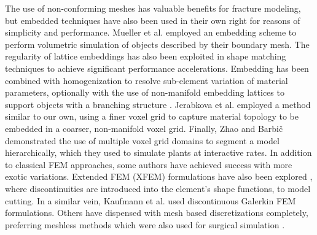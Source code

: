 \documentclass[12pt,oneside,letterpaper]{memoir}
\begin{document}
The use of non-conforming meshes has valuable benefits for fracture
modeling, but embedded techniques have also been used in their own
right for reasons of simplicity and performance. Mueller et al.\!
 employed an embedding scheme to perform
volumetric simulation of objects described by their boundary mesh. The
regularity of lattice embeddings has also been exploited in shape
matching techniques \cite{RiverJ:2007} to achieve significant
performance accelerations. Embedding has been combined with
homogenization \cite{NesmePF:2006,KhareMOD:2009} to resolve
sub-element variation of material parameters, optionally with the use
of non-manifold embedding lattices to support objects with a branching
structure \cite{NesmeKJF:2009}.  Jerabkova et al.\!
 employed a method similar to our own, using
a finer voxel grid to capture material topology to be embedded in a
coarser, non-manifold voxel grid. Finally, Zhao and Barbi\v{c}
 demonstrated the use of multiple voxel grid
domains to segment a model hierarchically, which they used to simulate
plants at interactive rates. In addition to classical FEM approaches,
some authors have achieved success with more exotic
variations. Extended FEM (XFEM) formulations have also been explored
\cite{JerabK:2009}, where discontinuities are introduced into the
element's shape functions, to model cutting. In a similar vein,
Kaufmann et al.\!   used discontinuous
Galerkin FEM formulations. Others have dispensed with mesh based
discretizations completely, preferring meshless methods
\cite{DeB:2000} which were also used for surgical simulation
\cite{DeKLS:2005}.
\end{document}
